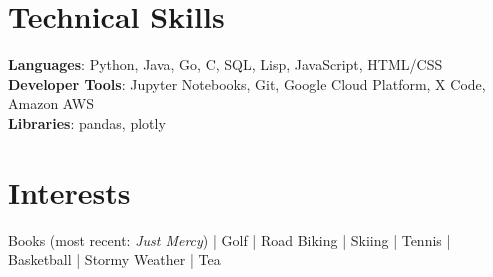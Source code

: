 \documentclass[a4paper,11pt]{article}
\begin{document}
%
\iftrue
\section{Technical Skills}
 \begin{itemize}[leftmargin=0.15in, label={}]
    \small{\item{
     \textbf{Languages}{: Python, Java, Go, C, SQL, Lisp, JavaScript, HTML/CSS} \\
     \textbf{Developer Tools}{: Jupyter Notebooks, Git, Google Cloud Platform, X Code, Amazon AWS} \\
     \textbf{Libraries}{: pandas, plotly}
    }}
 \end{itemize}
\fi


\section{Interests}
\begin{itemize}[leftmargin=0.15in, label={}]
    \small{\item{
    Books (most recent: \textit{Just Mercy}) | Golf | Road Biking | Skiing | Tennis | Basketball | Stormy Weather | Tea 
    }}
 \end{itemize}
\end{document}
